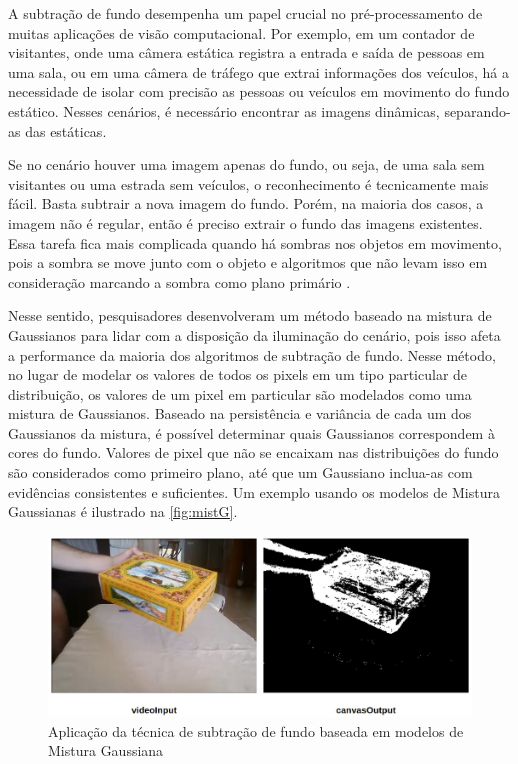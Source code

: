 \documentclass[12pt, %
openright, 
oneside, %
a4paper,    %
brazil]{facom-ufu-abntex2}
\begin{document}
A subtração de fundo desempenha um papel crucial no pré-processamento de muitas
aplicações de visão computacional. Por exemplo, em um contador de visitantes,
onde uma câmera estática registra a entrada e saída de pessoas em uma sala, ou
em uma câmera de tráfego que extrai informações dos veículos, há a necessidade
de isolar com precisão as pessoas ou veículos em movimento do fundo estático.
Nesses cenários, é necessário encontrar as imagens dinâmicas, separando-as das
estáticas.

Se no cenário houver uma imagem apenas do fundo, ou seja, de uma sala sem
visitantes ou uma estrada sem veículos, o reconhecimento é tecnicamente mais
fácil. Basta subtrair a nova imagem do fundo. Porém, na maioria dos casos, a
imagem não é regular, então é preciso extrair o fundo das imagens existentes.
Essa tarefa fica mais complicada quando há sombras nos objetos em movimento,
pois a sombra se move junto com o objeto e algoritmos que não levam isso em
consideração marcando a sombra como plano primário \cite{opencv_bgsubtraction}.

Nesse sentido, pesquisadores desenvolveram um método baseado na mistura de
Gaussianos para lidar com a disposição da iluminação do cenário, pois isso
afeta a performance da maioria dos algoritmos de subtração de fundo. Nesse
método, no lugar de modelar os valores de todos os pixels em um tipo particular
de distribuição, os valores de um pixel em particular são modelados como uma
mistura de Gaussianos. Baseado na persistência e variância de cada um dos
Gaussianos da mistura, é possível determinar quais Gaussianos correspondem à
cores do fundo. Valores de pixel que não se encaixam nas distribuições do fundo
são considerados como primeiro plano, até que um Gaussiano inclua-as com
evidências consistentes e suficientes. Um exemplo usando os modelos de Mistura
Gaussianas é ilustrado na \autoref{fig:mistG}.

\begin{figure}[ht]
	\centering
	\includegraphics[width=0.7\linewidth]{background_subtraction.jpeg}
	\caption{Aplicação da técnica de subtração de fundo baseada em modelos
		de Mistura Gaussiana}

	\label{fig:mistG}
\end{figure}
\end{document}
